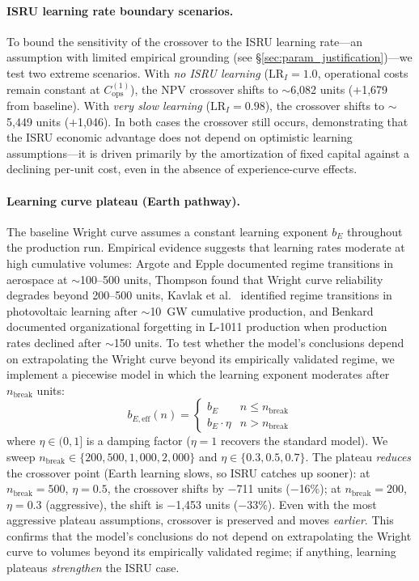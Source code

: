 \documentclass[preprint,12pt]{elsarticle}
\begin{document}
\paragraph{ISRU learning rate boundary scenarios.} To bound the sensitivity of the crossover to the ISRU learning rate---an assumption with limited empirical grounding (see \S\ref{sec:param_justification})---we test two extreme scenarios. With \emph{no ISRU learning} ($\mathrm{LR}_I = 1.0$, operational costs remain constant at $C_{\mathrm{ops}}^{(1)}$), the NPV crossover shifts to $\sim$6{,}082 units ($+$1{,}679 from baseline). With \emph{very slow learning} ($\mathrm{LR}_I = 0.98$), the crossover shifts to $\sim$5{,}449 units ($+$1{,}046). In both cases the crossover still occurs, demonstrating that the ISRU economic advantage does not depend on optimistic learning assumptions---it is driven primarily by the amortization of fixed capital against a declining per-unit cost, even in the absence of experience-curve effects.

\paragraph{Learning curve plateau (Earth pathway).} The baseline Wright curve assumes a constant learning exponent $b_E$ throughout the production run. Empirical evidence suggests that learning rates moderate at high cumulative volumes: Argote and Epple \cite{argote1990} documented regime transitions in aerospace at $\sim$100--500 units, Thompson \cite{thompson2012} found that Wright curve reliability degrades beyond 200--500 units, Kavlak et al.\ \cite{kavlak2018} identified regime transitions in photovoltaic learning after $\sim$10~GW cumulative production, and Benkard \cite{benkard2000} documented organizational forgetting in L-1011 production when production rates declined after $\sim$150 units. To test whether the model's conclusions depend on extrapolating the Wright curve beyond its empirically validated regime, we implement a piecewise model in which the learning exponent moderates after $n_{\mathrm{break}}$ units:
\begin{equation}
  b_{E,\mathrm{eff}}(n) = \begin{cases} b_E & n \leq n_{\mathrm{break}} \\ b_E \cdot \eta & n > n_{\mathrm{break}} \end{cases}
\end{equation}
where $\eta \in (0, 1]$ is a damping factor ($\eta = 1$ recovers the standard model). We sweep $n_{\mathrm{break}} \in \{200, 500, 1{,}000, 2{,}000\}$ and $\eta \in \{0.3, 0.5, 0.7\}$. The plateau \emph{reduces} the crossover point (Earth learning slows, so ISRU catches up sooner): at $n_{\mathrm{break}} = 500$, $\eta = 0.5$, the crossover shifts by $-$711 units ($-$16\%); at $n_{\mathrm{break}} = 200$, $\eta = 0.3$ (aggressive), the shift is $-$1{,}453 units ($-$33\%). Even with the most aggressive plateau assumptions, crossover is preserved and moves \emph{earlier}. This confirms that the model's conclusions do not depend on extrapolating the Wright curve to volumes beyond its empirically validated regime; if anything, learning plateaus \emph{strengthen} the ISRU case.
\end{document}

